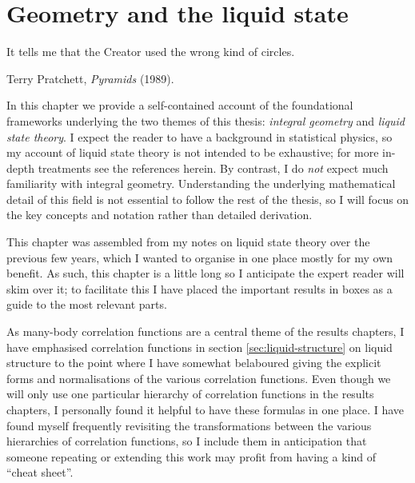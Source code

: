 \documentclass[11pt,twoside]{report}
\def\includebibliography{}
\begin{document}
\chapter{Geometry and the liquid state}
\epigraph{It tells me that the Creator used the wrong kind of circles.}{Terry Pratchett, \emph{Pyramids} (1989).}
\label{chapter:background}

In this chapter we provide a self-contained account of the foundational frameworks underlying the two themes of this thesis: \emph{integral geometry} and \emph{liquid state theory}.
I expect the reader to have a background in statistical physics, so my account of liquid state theory is not intended to be exhaustive; for more in-depth treatments see the references herein.
By contrast, I do \emph{not} expect much familiarity with integral geometry.
Understanding the underlying mathematical detail of this field is not essential to follow the rest of the thesis, so I will focus on the key concepts and notation rather than detailed derivation.

This chapter was assembled from my notes on liquid state theory over the previous few years, which I wanted to organise in one place mostly for my own benefit.
As such, this chapter is a little long so I anticipate the expert reader will skim over it; to facilitate this I have placed the important results in boxes as a guide to the most relevant parts.

As many-body correlation functions are a central theme of the results chapters, I have emphasised correlation functions in section \ref{sec:liquid-structure} on liquid structure to the point where I have somewhat belaboured giving the explicit forms and normalisations of the various correlation functions.
Even though we will only use one particular hierarchy of correlation functions in the results chapters, I personally found it helpful to have these formulas in one place.
I have found myself frequently revisiting the transformations between the various hierarchies of correlation functions, so I include them in anticipation that someone repeating or extending this work may profit from having a kind of ``cheat sheet''.





\ifdefined\includebibliography
  \printbibliography
\fi
\end{document}
